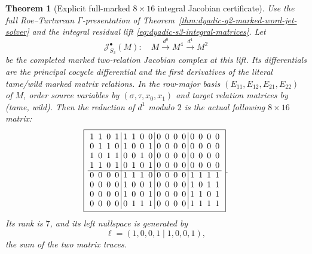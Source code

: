 \documentclass[11pt]{article}
\newtheorem{theorem}{Theorem}[section]
\theoremstyle{definition}
\begin{document}
\begin{theorem}[Explicit full-marked $8\times16$ integral Jacobian certificate]
\label{thm:dyadic-s3-marked-adjoint-jacobian}
Use the full Roe--Turturean
$\Gamma$-presentation of
Theorem~\ref{thm:dyadic-q2-marked-word-jet-solver}
and the integral residual lift
\eqref{eq:dyadic-s3-integral-matrices}.
Let
\begin{equation}\label{eq:dyadic-s3-marked-adjoint-complex}
\mathcal J^\bullet_{S_3}(M):
\quad
M\xrightarrow{d^0} M^{4}
\xrightarrow{d^1} M^{2}
\end{equation}
be the completed marked two-relation
Jacobian complex at this lift.
Its differentials are the principal
cocycle differential and the first
derivatives of the literal tame/wild
marked matrix relations.
In the row-major basis
$(E_{11},E_{12},E_{21},E_{22})$
of $M$, order source variables by
$(\sigma,\tau,x_0,x_1)$
and target relation matrices by
(tame, wild).  Then the reduction
of $d^1$ modulo $2$ is the
\emph{actual} following $8\times16$
matrix:
\begin{equation}\label{eq:dyadic-s3-jacobian-mod2-matrix}
\boxed{\ \!
{\renewcommand{\arraystretch}{0.95}
\setlength{\arraycolsep}{2.5pt}
\begin{array}{rrrr|rrrr|rrrr|rrrr}
1&1&0&1&1&1&0&0&0&0&0&0&0&0&0&0\\
0&1&1&0&1&0&0&1&0&0&0&0&0&0&0&0\\
1&0&1&1&0&0&1&0&0&0&0&0&0&0&0&0\\
1&1&0&1&0&1&0&1&0&0&0&0&0&0&0&0\\ \hline
0&0&0&0&1&1&1&0&0&0&0&0&1&1&1&1\\
0&0&0&0&1&0&0&1&0&0&0&0&1&0&1&1\\
0&0&0&0&1&0&0&1&0&0&0&0&1&1&0&1\\
0&0&0&0&0&1&1&1&0&0&0&0&1&1&1&1
\end{array}}\ \! } .
\end{equation}
Its rank is $7$, and its
left nullspace is generated by
\begin{equation}\label{eq:dyadic-s3-jacobian-left-null}
\ell=(1,0,0,1\mid1,0,0,1),
\end{equation}
the sum of the two matrix traces.


\end{theorem}
\end{document}
